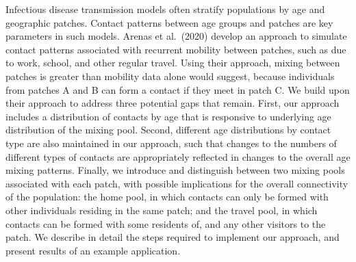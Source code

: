Infectious disease transmission models often stratify populations by age and geographic patches.
Contact patterns between age groups and patches are key parameters in such models.
Arenas et al.\ (2020) develop an approach to simulate contact patterns associated with
recurrent mobility between patches, such as due to work, school, and other regular travel.
Using their approach, mixing between patches is greater than mobility data alone would suggest,
because individuals from patches A and B can form a contact if they meet in patch C.
We build upon their approach to address three potential gaps that remain.
First, our approach includes a distribution of contacts by age
that is responsive to underlying age distribution of the mixing pool.
Second, different age distributions by contact type are also maintained in our approach,
such that changes to the numbers of different types of contacts
are appropriately reflected in changes to the overall age mixing patterns.
Finally, we introduce and distinguish between two mixing pools associated with each patch,
with possible implications for the overall connectivity of the population:
the home pool, in which contacts can only be formed with other individuals residing in the same patch;
and the travel pool, in which contacts can be formed with some residents of, and any other visitors to the patch.
We describe in detail the steps required to implement our approach,
and present results of an example application.
